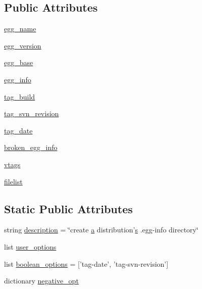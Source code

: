\subsection*{Public Attributes}
\begin{DoxyCompactItemize}
\item 
\hyperlink{classsetuptools_1_1command_1_1egg__info_1_1egg__info_a12dbb5447dc9c2bca513d8841a8394ca}{egg\+\_\+name}
\item 
\hyperlink{classsetuptools_1_1command_1_1egg__info_1_1egg__info_a7567470fab1812a5bd2a31653482d3a1}{egg\+\_\+version}
\item 
\hyperlink{classsetuptools_1_1command_1_1egg__info_1_1egg__info_a749461ae4fdd7081787607b7dd0899cb}{egg\+\_\+base}
\item 
\hyperlink{classsetuptools_1_1command_1_1egg__info_1_1egg__info_ac0d4a2c1b84c0d8d939fe957b7793196}{egg\+\_\+info}
\item 
\hyperlink{classsetuptools_1_1command_1_1egg__info_1_1egg__info_a15f7a1e56400a2479d9669125a0af5e8}{tag\+\_\+build}
\item 
\hyperlink{classsetuptools_1_1command_1_1egg__info_1_1egg__info_af0b2014cb8a1badff1a1641ca1275a0f}{tag\+\_\+svn\+\_\+revision}
\item 
\hyperlink{classsetuptools_1_1command_1_1egg__info_1_1egg__info_a67caa5eb828fe787a2a6da287ad3b1f0}{tag\+\_\+date}
\item 
\hyperlink{classsetuptools_1_1command_1_1egg__info_1_1egg__info_a2913df2daa81ec130d5ce5267c861245}{broken\+\_\+egg\+\_\+info}
\item 
\hyperlink{classsetuptools_1_1command_1_1egg__info_1_1egg__info_a6c099c7db571c1095cccb67288b2da66}{vtags}
\item 
\hyperlink{classsetuptools_1_1command_1_1egg__info_1_1egg__info_a1e64f1f969ca6d440b9dbf8dd9c2a249}{filelist}
\end{DoxyCompactItemize}
\subsection*{Static Public Attributes}
\begin{DoxyCompactItemize}
\item 
string \hyperlink{classsetuptools_1_1command_1_1egg__info_1_1egg__info_a934bb82d16eaa4541b2bad5096ba8a14}{description} = \char`\"{}create \hyperlink{gen__mat5files_8m_aae328bf20413f220e38aec4d95bfd6da}{a} distribution'\hyperlink{indexexpr_8h_ae024b0db549122b44c349ae28ec990dc}{s} .egg-\/info directory\char`\"{}
\item 
list \hyperlink{classsetuptools_1_1command_1_1egg__info_1_1egg__info_a77231052ffcc31b95fd27ea6747df6d6}{user\+\_\+options}
\item 
list \hyperlink{classsetuptools_1_1command_1_1egg__info_1_1egg__info_ae46504dc1aff8a623829bdb3a6520059}{boolean\+\_\+options} = \mbox{[}'tag-\/date', 'tag-\/svn-\/revision'\mbox{]}
\item 
dictionary \hyperlink{classsetuptools_1_1command_1_1egg__info_1_1egg__info_a943f2c2d1031c21852c19ed7e1a2c4d3}{negative\+\_\+opt}
\end{DoxyCompactItemize}


